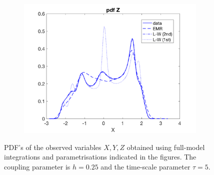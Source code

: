 \documentclass[12pt]{article}
\begin{document}
\begin{figure}[H]
\begin{subfigure}[b]{0.3\textwidth}
		\includegraphics[width=\textwidth]{plots/l84l63/pdfz025z.png}
	\end{subfigure}
	\hfill
	\caption{PDF's of the observed variables $X,Y,Z$ obtained using full-model integrations and parametrisations indicated in the figures. The coupling parameter is $h=0.25$ and the time-scale parameter $\tau =5$.}
\end{figure}
\end{document}
